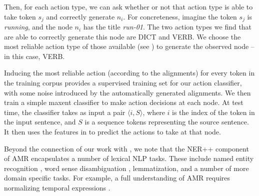\documentclass[11pt]{article}
\newcommand\w[1]{\textit{#1}} %
\newcommand\n[1]{\textit{#1}} %
\begin{document}
Then, for each action type, we can ask whether or not that action type is able to take 
  token $s_j$ and correctly generate $n_i$. 
For concreteness, imagine the token $s_j$ is \w{running}, and the node $n_i$ has 
  the title \n{run-01}.
The two action types we find that are 
  able to correctly generate this node are DICT and VERB. 
We choose the most reliable action type of those available (see )
  to generate the observed node -- in this case, VERB.
  
Inducing the most reliable action (according to the alignments) for every token in the training corpus provides a supervised training set for our action classifier, with some noise introduced by the automatically generated alignments.
We then train a simple maxent classifier to make action decisions at each node. 
At test time,
  the classifier takes as input a pair $\langle i, S \rangle$, where $i$ is the 
  index of the token in the input sentence, and $S$ is a sequence tokens 
  representing the source sentence.
It then uses the features in  to predict the actions to take at
  that node.


%
%
%
%






Beyond the connection of our work with , we note that 
the NER++ component of AMR encapsulates a number of lexical NLP tasks.
These include named entity recognition \cite{2007nadeau-ner,stanford-ner},
  word sense disambiguation \cite{1995yarowsky-wsd,2002banerjee-wsd},
  lemmatization, and a number of more domain specific tasks.
For example, a full understanding of AMR requires normalizing temporal
  expressions \cite{2010verhagen-tempeval,2010strotgen-temporal,2012chang-temporal}.
 
\end{document}
